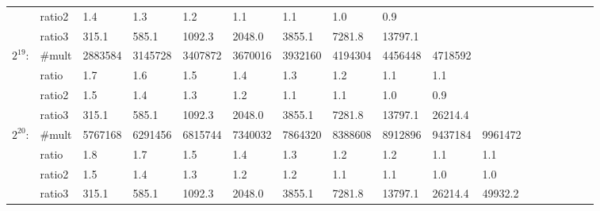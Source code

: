 \documentclass[10pt]{article}
\begin{document}
\begin{table*}
{\begin{tabular}{lllllllllllllllll}
          & ratio2 & 1.4& 1.3& 1.2& 1.1& 1.1& 1.0& 0.9\\
          & ratio3 & 315.1& 585.1& 1092.3& 2048.0& 3855.1& 7281.8& 13797.1\\[.3em]
$2^{19}$: & \#mult &  2883584&  3145728&  3407872&  3670016&  3932160&  4194304&  4456448&  4718592\\
          & ratio & 1.7& 1.6& 1.5& 1.4& 1.3& 1.2& 1.1& 1.1\\
          & ratio2 & 1.5& 1.4& 1.3& 1.2& 1.1& 1.1& 1.0& 0.9\\
          & ratio3 & 315.1& 585.1& 1092.3& 2048.0& 3855.1& 7281.8& 13797.1& 26214.4\\[.3em]
$2^{20}$: & \#mult &  5767168&  6291456&  6815744&  7340032&  7864320&  8388608&  8912896&  9437184&  9961472\\
          & ratio & 1.8& 1.7& 1.5& 1.4& 1.3& 1.2& 1.2& 1.1& 1.1\\
          & ratio2 & 1.5& 1.4& 1.3& 1.2& 1.2& 1.1& 1.1& 1.0& 1.0\\
          & ratio3 & 315.1& 585.1& 1092.3& 2048.0& 3855.1& 7281.8& 13797.1& 26214.4& 49932.2\\[.3em]

\hline
\end{tabular}
}
\end{table*}
\end{document}
